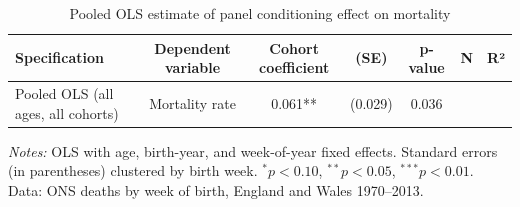 \begin{table}[htbp]
  \centering
  \small

  \caption{Pooled OLS estimate of panel conditioning effect on mortality}
  \label{tab:pooled}
  \begin{tabular}{lcccccc}
  \toprule
  \textbf{Specification} & \textbf{Dependent variable} & \textbf{Cohort coefficient} & \textbf{(SE)} & \textbf{p-value} & \textbf{N} & \textbf{R²} \\
  \midrule
  Pooled OLS (all ages, all cohorts) & Mortality rate & 0.061** & (0.029) & 0.036 &  &  \\
  \bottomrule
  \end{tabular}
  \begin{tablenotes}
    \footnotesize
    \item \textit{Notes:} OLS with age, birth-year, and week-of-year fixed effects.
    Standard errors (in parentheses) clustered by birth week.
    $^{*}p<0.10$, $^{**}p<0.05$, $^{***}p<0.01$.
    Data: ONS deaths by week of birth, England and Wales 1970--2013.
  \end{tablenotes}
\end{table}
